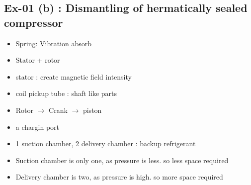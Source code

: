 \documentclass[14pt]{article}
\begin{document}
\begin{multicols}{2}
    \section{Ex-01 (b) : Dismantling of hermatically sealed compressor}
    \begin{itemize}
        \item Spring: Vibration absorb 
        \item Stator + rotor 
        \item stator : create magnetic field intensity 
        \item coil pickup tube : shaft like parts 
        \item Rotor $\rightarrow$ Crank $\rightarrow$ piston
        \item a chargin port
        \item 1 suction chamber, 2 delivery chamber : backup refrigerant 
        \item Suction chamber is only one, as pressure is less. so less space required 
        \item Delivery chamber is two, as pressure is high. so more space required
    \end{itemize}

    \end{multicols}
\end{document}
